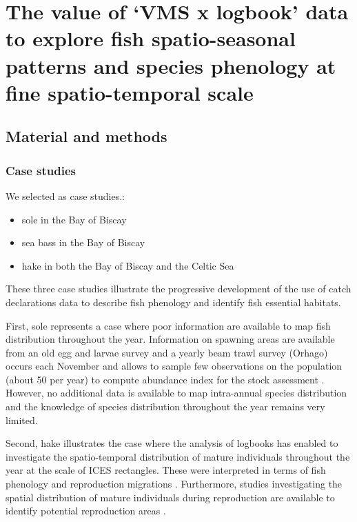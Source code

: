 \section{The value of `VMS x logbook' data to explore fish spatio-seasonal patterns and species phenology at fine spatio-temporal scale}\label{appendix:EOFSM}

\subsection{Material and methods}

\subsubsection{Case studies}

We selected as case studies.:

\begin{itemize}

\item sole in the Bay of Biscay
\item sea bass in the Bay of Biscay 
\item hake in both the Bay of Biscay and the Celtic Sea

\end{itemize}

These three case studies illustrate the progressive development of the use of catch declarations data to describe fish phenology and identify fish essential habitats. 

First, sole represents a case where poor information are available to map fish distribution throughout the year. Information on spawning areas are available from an old egg and larvae survey \parencite{arbault-estimation-1986} and a yearly beam trawl survey (Orhago) occurs each November and allows to sample few observations on the population (about 50 per year) to compute abundance index for the stock assessment \parencite{biais-gerard-orhago-2003}. However, no additional data is available to map intra-annual species distribution and the knowledge of species distribution throughout the year remains very limited.

Second, hake illustrates the case where the analysis of logbooks has enabled to investigate the spatio-temporal distribution of mature individuals throughout the year at the scale of ICES rectangles. These were interpreted in terms of fish phenology and reproduction migrations \parencite{poulard2001distribution}. Furthermore, studies investigating the spatial distribution of mature individuals during reproduction are available to identify potential reproduction areas \parencite{tidd2006species}.

